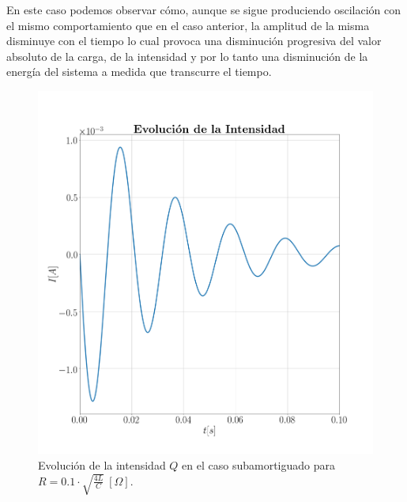 \documentclass[journal]{IEEEtran}
\begin{document}
En este caso podemos observar cómo, aunque se sigue produciendo oscilación con el mismo comportamiento que en el caso anterior, la amplitud de la misma disminuye con el tiempo lo cual provoca una disminución progresiva del valor absoluto de la carga, de la intensidad y por lo tanto una disminución de la energía del sistema a medida que transcurre el tiempo.

\begin{figure}[!htb]
    \centering
    \includegraphics[width=\linewidth,trim={40 70 70 70},clip]{intensidadsubamortiguado.png}
    \caption{Evolución de la intensidad $Q$ en el caso subamortiguado para $R=0.1 \cdot\sqrt{\frac{4L}{C}}~[\Omega]$.}
    \label{fig:intensidadsubamortiguado}
\end{figure}
\end{document}

